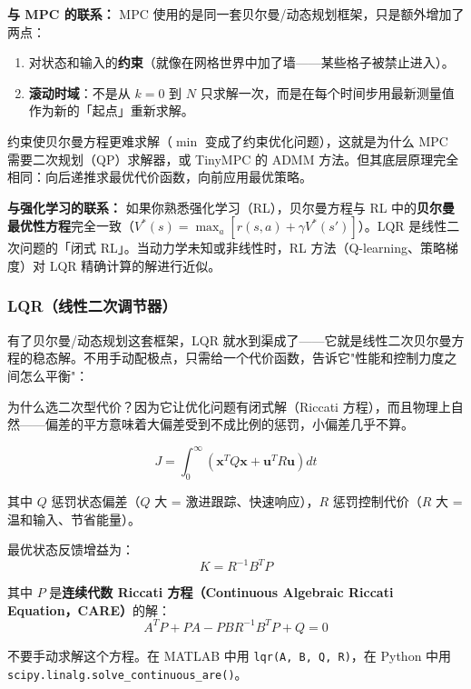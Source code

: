 \textbf{与 MPC 的联系：} MPC 使用的是同一套贝尔曼/动态规划框架，只是额外增加了两点：
\begin{enumerate}
    \item 对状态和输入的\textbf{约束}（就像在网格世界中加了墙——某些格子被禁止进入）。
    \item \textbf{滚动时域}：不是从 $k = 0$ 到 $N$ 只求解一次，而是在每个时间步用最新测量值作为新的「起点」重新求解。
\end{enumerate}

约束使贝尔曼方程更难求解（$\min$ 变成了约束优化问题），这就是为什么 MPC 需要二次规划（QP）求解器，或 TinyMPC 的 ADMM 方法。但其底层原理完全相同：向后递推求最优代价函数，向前应用最优策略。

\textbf{与强化学习的联系：} 如果你熟悉强化学习（RL），贝尔曼方程与 RL 中的\textbf{贝尔曼最优性方程}完全一致（$V^*(s) = \max_a [r(s,a) + \gamma V^*(s')]$）。LQR 是线性二次问题的「闭式 RL」。当动力学未知或非线性时，RL 方法（Q-learning、策略梯度）对 LQR 精确计算的解进行近似。

\subsubsection{LQR（线性二次调节器）}

有了贝尔曼/动态规划这套框架，LQR 就水到渠成了——它就是线性二次贝尔曼方程的稳态解。不用手动配极点，只需给一个代价函数，告诉它"性能和控制力度之间怎么平衡"：

为什么选二次型代价？因为它让优化问题有闭式解（Riccati 方程），而且物理上自然——偏差的平方意味着大偏差受到不成比例的惩罚，小偏差几乎不算。

\begin{equation}
J = \int_0^{\infty} \left( \mathbf{x}^T Q \mathbf{x} + \mathbf{u}^T R \mathbf{u} \right) dt
\end{equation}

其中 $Q$ 惩罚状态偏差（$Q$ 大 = 激进跟踪、快速响应），$R$ 惩罚控制代价（$R$ 大 = 温和输入、节省能量）。

最优状态反馈增益为：
\begin{equation}
K = R^{-1} B^T P
\end{equation}

其中 $P$ 是\textbf{连续代数 Riccati 方程（Continuous Algebraic Riccati Equation，CARE）}的解：
\begin{equation}
A^T P + PA - PBR^{-1}B^T P + Q = 0
\end{equation}

不要手动求解这个方程。在 MATLAB 中用 \texttt{lqr(A, B, Q, R)}，在 Python 中用 \texttt{scipy.linalg.solve\_continuous\_are()}。

